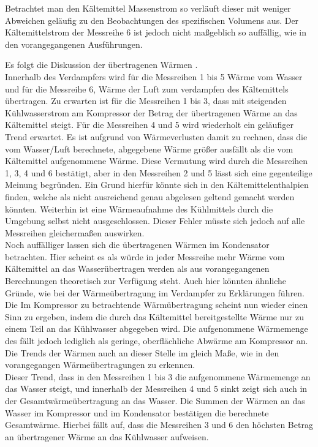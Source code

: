 Betrachtet man den Kältemittel Massenstrom so verläuft dieser mit weniger Abweichen geläufig zu den Beobachtungen des spezifischen Volumens aus. Der Kältemittelstrom der Messreihe 6 ist jedoch nicht maßgeblich so auffällig, wie in den vorangegangenen Ausführungen.

Es folgt die Diskussion der übertragenen Wärmen .\\
Innerhalb des Verdampfers wird für die Messreihen 1 bis 5 Wärme vom Wasser und für die Messreihe 6, Wärme der Luft zum verdampfen des Kältemittels übertragen. Zu erwarten ist für die Messreihen 1 bis 3, dass mit steigenden Kühlwasserstrom am Kompressor der Betrag der übertragenen Wärme an das Kältemittel steigt. Für die Messreihen 4 und 5 wird wiederholt ein geläufiger Trend erwartet. Es ist aufgrund von Wärmeverlusten damit zu rechnen, dass die vom Wasser/Luft berechnete, abgegebene Wärme größer ausfällt als die vom Kältemittel aufgenommene Wärme. Diese Vermutung wird durch die Messreihen 1, 3, 4 und 6 bestätigt, aber in den Messreihen 2 und 5 lässt sich eine gegenteilige Meinung begründen. Ein Grund hierfür könnte sich in den Kältemittelenthalpien finden, welche als nicht ausreichend genau abgelesen geltend gemacht werden könnten. Weiterhin ist eine Wärmeaufnahme des Kühlmittels durch die Umgebung selbst nicht ausgeschlossen. Dieser Fehler müsste sich jedoch auf alle Messreihen gleichermaßen auswirken.\\
Noch auffälliger lassen sich die übertragenen Wärmen im Kondensator betrachten. Hier scheint es als würde in jeder Messreihe mehr Wärme vom Kältemittel an das Wasserübertragen werden als aus vorangegangenen Berechnungen theoretisch zur Verfügung steht. Auch hier könnten ähnliche Gründe, wie bei der Wärmeübertragung im Verdampfer zu Erklärungen führen.\\

Die Im Kompressor zu betrachtende Wärmübertragung scheint nun wieder einen Sinn zu ergeben, indem die durch das Kältemittel bereitgestellte Wärme nur zu einem Teil an das Kühlwasser abgegeben wird. Die aufgenommene Wärmemenge des fällt jedoch lediglich als geringe, oberflächliche Abwärme am Kompressor an. Die Trends der Wärmen auch an dieser Stelle im gleich Maße, wie in den vorangegangen Wärmeübertragungen zu erkennen.\\

Dieser Trend, dass in den Messreihen 1 bis 3 die aufgenommene Wärmemenge an das Wasser steigt, und innerhalb der Messreihen 4 und 5 sinkt zeigt sich auch in der Gesamtwärmeübertragung an das Wasser. Die Summen der Wärmen an das Wasser im Kompressor und im Kondensator bestätigen die berechnete Gesamtwärme. Hierbei fällt auf, dass die Messreihen 3 und 6 den höchsten Betrag  an übertragener Wärme an das Kühlwasser aufweisen.\\

